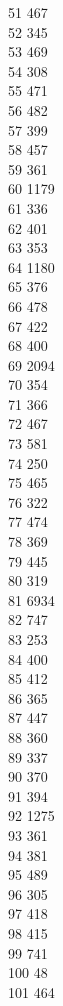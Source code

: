 { 51	467 \\
 52	345 \\
 53	469 \\
 54	308 \\
 55	471 \\
 56	482 \\
 57	399 \\
 58	457 \\
 59	361 \\
 60	1179 \\
 61	336 \\
 62	401 \\
 63	353 \\
 64	1180 \\
 65	376 \\
 66	478 \\
 67	422 \\
 68	400 \\
 69	2094 \\
 70	354 \\
 71	366 \\
 72	467 \\
 73	581 \\
 74	250 \\
 75	465 \\
 76	322 \\
 77	474 \\
 78	369 \\
 79	445 \\
 80	319 \\
 81	6934 \\
 82	747 \\
 83	253 \\
 84	400 \\
 85	412 \\
 86	365 \\
 87	447 \\
 88	360 \\
 89	337 \\
 90	370 \\
 91	394 \\
 92	1275 \\
 93	361 \\
 94	381 \\
 95	489 \\
 96	305 \\
 97	418 \\
 98	415 \\
 99	741 \\
 100	48 \\
 101	464 \\
}

